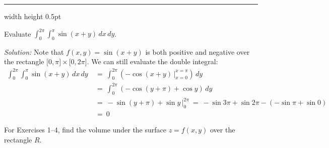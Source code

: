 \medskip
\hrule width \textwidth height 0.5pt
\begin{exmp}
 Evaluate $\displaystyle\int_0^{2\pi} \displaystyle\int_0^{\pi} \sin (x+y) \,dx\,dy$.\smallskip
 \par\noindent \emph{Solution:} Note that $f(x,y) = \sin (x+y)$ is both positive and negative over the rectangle
 $\lbrack 0,\pi \rbrack \times \lbrack 0,2\pi \rbrack$. We can still evaluate the double integral:
 \begin{align*}
  \int_0^{2\pi} \int_0^{\pi} \sin (x+y) \,dx\,dy
   ~&=~ \int_0^{2\pi} \left( -\cos (x+y) \,\Big|_{x=0}^{x=\pi} \right) \,dy\\
   &=~ \int_0^{2\pi} (-\cos (y+\pi) + \cos y) \,dy\\
   &=~ -\sin (y+\pi) + \sin y \,\Big|_0^{2\pi} ~=~ -\sin 3\pi + \sin 2\pi - (-\sin \pi + \sin 0)\\
   &=~ 0
 \end{align*}
\end{exmp}
\startexercises\label{sec3dot1}
\par\noindent For Exercises 1--4, find the volume under the surface $z=f(x,y)$ over the rectangle $R$.
